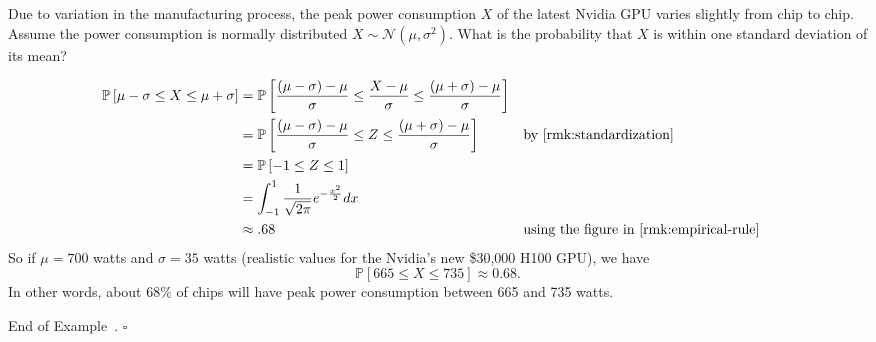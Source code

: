\documentclass[10pt]{article}
\theoremstyle{definition}
\newtheorem{definition}[theorem]{Definition}
\newtheorem{example}[theorem]{Example}
\renewenvironment{example}
{\begin{oldexample}}
  {\par\smallskip\hfill   End of Example~\theexample. $\square$    \par\end{oldexample}}
\newcommand{\1}[1]{\textbf{1}_{\left[#1\right]}} %
\def\P{\mathbb{P}} %
\DeclareRobustCommand{\demph}[1]{%
  \ifmmode
  {\color{Blue}#1}%
  \else
  {\color{Blue}\bfseries\slshape #1}%
  \fi
}
\begin{document}
\begin{example}
  Due to variation in the manufacturing process, the peak power consumption $X$ of
  the latest Nvidia GPU varies slightly from chip to chip. Assume the power
  consumption is normally distributed $X\sim \mathcal{N}(\mu,\sigma^{2})$. What
  is the probability that $X$ is within one standard deviation of its mean?

  \begin{align*}
    \P\left[\mu-\sigma \leq X \leq \mu+\sigma\right]
    &= \P\left[ \frac{(\mu-\sigma)-\mu}{\sigma}\leq \frac{X-\mu}{\sigma} \leq \frac{(\mu+\sigma)-\mu}{\sigma}\right]\\
    &= \P\left[ \frac{(\mu-\sigma)-\mu}{\sigma}\leq Z \leq
      \frac{(\mu+\sigma)-\mu}{\sigma}\right] &&\text{by \cref{rmk:standardization} }\\
    &= \P\left[-1 \leq Z \leq 1\right]\\
    &= \int_{-1}^{1}\frac{1}{\sqrt{2 \pi}} e^{-\frac{x^{2}}{2}}dx\\
    &\approx .68 &&\text{using the figure in \cref{rmk:empirical-rule}}
  \end{align*}
  So if $\mu=700$ watts and $\sigma= 35$ watts (realistic values for the
  Nvidia's new \$30,000 H100 GPU), we have
  \begin{equation*}
    \P\left[665 \leq X \leq 735\right]\approx 0.68.
  \end{equation*}
  In other words, about 68\% of chips will have peak power consumption between
  665 and 735 watts.
\end{example}





\end{document}
